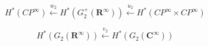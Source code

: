 $$H^*(CP^\infty) \xleftarrow{w_2} H^*(G_2^+(\mathbf{R}^\infty)) \xleftarrow{u_2} H^*(CP^\infty \times CP^\infty)$$

$$H^*(G_2(\mathbf{R}^\infty)) \xleftarrow{v_2} H^*(G_2(\mathbf{C}^\infty))$$
